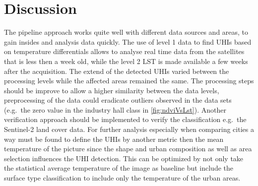 \documentclass[a4paper, english]{article}
\begin{document}
\section{Discussion}
The pipeline approach works quite well with different data sources and areas, to gain insides and analysis data quickly.
The use of level 1 data to find \acp{UHI} based on temperature differentials allows to analyse real time data from the satellites that is less then a week old, while the level 2 \ac{LST} is made available a few weeks after the acquisition.
The extend of the detected \acp{UHI} varied between the processing levels while the affected areas remained the same. 
The processing steps should be improve to allow a higher similarity between the data levels, preprocessing of the data could eradicate outliers observed in the data sets (e.g.~the zero value in the industry hall class in \cref{fig:ndviVsLst}).
Another verification approach should be implemented to verify the classification e.g.~the Sentinel-2 land cover data. 
For further analysis especially when comparing cities a way must be found to define the \acp{UHI} by another metric then the mean temperature of the picture since the shape and urban composition as well as area selection influences the \ac{UHI} detection. 
%
%
This can be optimized by not only take the statistical average temperature of the image as baseline but include the surface type classification to include only the temperature of the urban areas.  
% 
%
%
%
\end{document}
